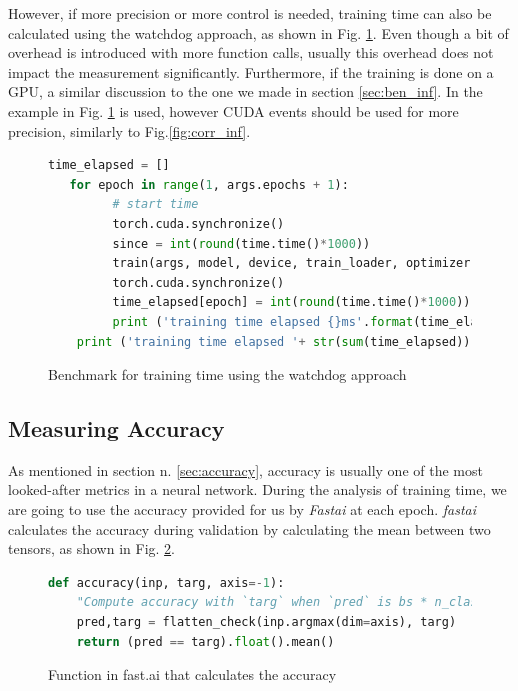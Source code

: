 However, if more precision or more control is needed, training time can also be calculated using the watchdog approach, as shown in Fig. \ref{fig:ben_tra}. Even though a bit of overhead is introduced with more function calls, usually this overhead does not impact the measurement significantly. Furthermore, if the training is done on a GPU, a similar discussion to the one we made in section \ref{sec:ben_inf}. In the example in Fig. \ref{fig:ben_tra} is used, however CUDA events should be used for more precision, similarly to Fig.\ref{fig:corr_inf}. 
\begin{figure}[h]
\begin{lstlisting}[language=python]
   time_elapsed = []
   for epoch in range(1, args.epochs + 1):
         # start time
         torch.cuda.synchronize()
         since = int(round(time.time()*1000))
         train(args, model, device, train_loader, optimizer, epoch)
         torch.cuda.synchronize()
         time_elapsed[epoch] = int(round(time.time()*1000)) - since
         print ('training time elapsed {}ms'.format(time_elapsed[epoch]))
    print ('training time elapsed '+ str(sum(time_elapsed)) + 'ms')
\end{lstlisting}
\caption{Benchmark for training time using the watchdog approach}
\label{fig:ben_tra}
\end{figure}




\subsection{Measuring Accuracy}
As mentioned in section n. \ref{sec:accuracy}, accuracy is usually one of the most looked-after metrics in a neural network. 
During the analysis of training time, we are going to use the accuracy provided for us by \textit{Fastai} at each epoch. \textit{fastai} calculates the accuracy during validation by calculating the mean between two tensors, as shown in Fig. \ref{fig:fast_acc}. \cite{fastaidocs}
\begin{figure}[h]
\begin{lstlisting}[language=python]
def accuracy(inp, targ, axis=-1):
    "Compute accuracy with `targ` when `pred` is bs * n_classes"
    pred,targ = flatten_check(inp.argmax(dim=axis), targ)
    return (pred == targ).float().mean()
\end{lstlisting}
\caption[Function in fast.ai that calculates the accuracy]{Function in fast.ai that calculates the accuracy \cite{fastaidocs}}
\label{fig:fast_acc}
\end{figure}














